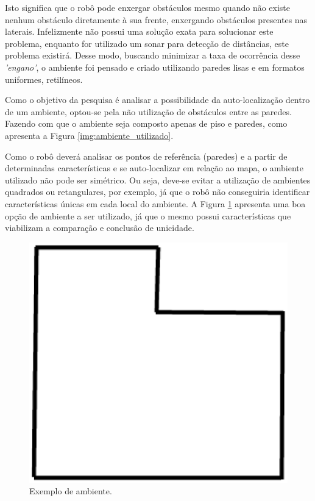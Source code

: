 	Isto significa que o robô pode enxergar obstáculos mesmo quando não existe nenhum obstáculo diretamente à sua frente, enxergando obstáculos presentes nas laterais. Infelizmente não possui uma solução exata para solucionar este problema, enquanto for utilizado um sonar para detecção de distâncias, este problema existirá. Desse modo, buscando minimizar a taxa de ocorrência desse \textit{'engano'}, o ambiente foi pensado e criado utilizando paredes lisas e em formatos uniformes, retilíneos.

	Como o objetivo da pesquisa é analisar a possibilidade da auto-localização dentro de um ambiente, optou-se pela não utilização de obstáculos entre as paredes. Fazendo com que o ambiente seja composto apenas de piso e paredes, como apresenta a Figura \ref{img:ambiente_utilizado}. 

	Como o robô deverá analisar os pontos de referência (paredes) e a partir de determinadas características e se auto-localizar em relação ao mapa, o ambiente utilizado não pode ser simétrico. Ou seja, deve-se evitar a utilização de ambientes quadrados ou retangulares, por exemplo, já que o robô não conseguiria identificar características únicas em cada local do ambiente. A Figura \ref{img:exemplo_ambiente} apresenta uma boa opção de ambiente a ser utilizado, já que o mesmo possui características que viabilizam a comparação e conclusão de unicidade.

	\begin{figure}[H]
		\centering
		\includegraphics[scale=0.5]{figuras/exemplo_ambiente.eps}
		\caption[Exemplo de ambiente]{Exemplo de ambiente.}
		\label{img:exemplo_ambiente}
	\end{figure}

